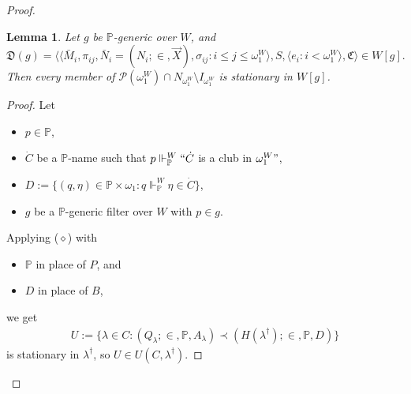 \documentclass[12pt, twoside]{memoir}
\numberwithin{equation}{section}
\newtheorem{lem}[thm]{Lemma}
\theoremstyle{definition}
\theoremstyle{remark}
\theoremstyle{definition}
\theoremstyle{definition}
\theoremstyle{definition}
\theoremstyle{remark}
\begin{document}
\begin{proof}
\begin{lem}\label{lem453}
Let $g$ be $\mathbb{P}$-generic over $W$, and
\begin{equation*}
    \mathfrak{D}(g) = \langle \langle \bar{M}_i, \pi_{ij},  \bar{N}_i = (N_i; \in, \Vec{X}), \sigma_{ij} : i \leq j \leq \omega_1^W \rangle, S, \langle e_i : i < \omega_1^W \rangle, \mathfrak{C} \rangle \in W[g] \text{.}
\end{equation*}
Then every member of $\mathcal{P}(\omega_1^W) \cap N_{\omega_1^W} \setminus I_{\omega_1^W}$ is stationary in $W[g]$.
\end{lem}

\begin{proof}
Let 
\begin{itemize}
    \item $p \in \mathbb{P}$,
    \item $\dot{C}$ be a $\mathbb{P}$-name such that $p \Vdash^W_{\mathbb{P}} ``\dot{C}$ is a club in $\omega_1^W"$,
    \item $D := \{(q, \eta) \in \mathbb{P} \times \omega_1 : q \Vdash^W_{\mathbb{P}} \eta \in \dot{C}\}$,
    \item $g$ be a $\mathbb{P}$-generic filter over $W$ with $p \in g$.
\end{itemize}
Applying ($\diamond$) with 
\begin{itemize}
    \item $\mathbb{P}$ in place of $P$, and
    \item $D$ in place of $B$,
\end{itemize}
we get
\begin{align*}
    U := \{\lambda \in C : (Q_{\lambda}; \in, \mathbb{P}, A_{\lambda}) \prec (H(\lambda^{\dagger}); \in, \mathbb{P}, D)\}
\end{align*}
is stationary in $\lambda^{\dagger}$, so $U \in U(C, \lambda^{\dagger})$.


\end{proof}
\end{proof}
\end{document}
